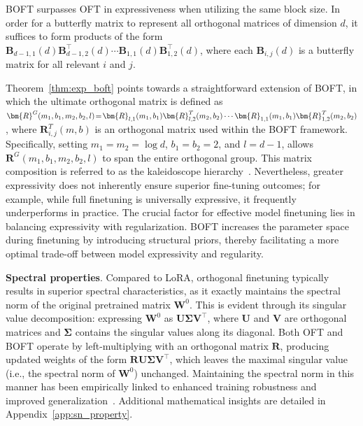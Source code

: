 \begin{theorem}\label{thm:exp_boft}
    BOFT surpasses OFT in expressiveness when utilizing the same block size. In order for a butterfly matrix to represent all orthogonal matrices of dimension $d$, it suffices to form products of the form $\bm{B}_{d-1,1}(d)\bm{B}^\top_{d-1,2}(d)\cdots\bm{B}_{1,1}(d)\bm{B}^\top_{1,2}(d)$, where each $\bm{B}_{i,j}(d)$ is a butterfly matrix for all relevant $i$ and $j$.
\end{theorem}

Theorem~\ref{thm:exp_boft} points towards a straightforward extension of BOFT, in which the ultimate orthogonal matrix is defined as $\thickmuskip=2mu \medmuskip=2mu \bm{R}^G(m_1,b_1,m_2,b_2,l)=\bm{R}_{l,1}(m_1,b_1)\bm{R}_{l,2}^T(m_2,b_2)\cdots\bm{R}_{1,1}(m_1,b_1)\bm{R}_{1,2}^T(m_2,b_2)$, where $\bm{R}_{i,j}^T(m,b)$ is an orthogonal matrix used within the BOFT framework. Specifically, setting $m_1=m_2=\log d$, $b_1=b_2=2$, and $l=d-1$, allows $\bm{R}^G(m_1,b_1,m_2,b_2,l)$ to span the entire orthogonal group. This matrix composition is referred to as the kaleidoscope hierarchy~\cite{dao2019kaleidoscope}. Nevertheless, greater expressivity does not inherently ensure superior fine-tuning outcomes; for example, while full finetuning is universally expressive, it frequently underperforms in practice. The crucial factor for effective model finetuning lies in balancing expressivity with regularization. BOFT increases the parameter space during finetuning by introducing structural priors, thereby facilitating a more optimal trade-off between model expressivity and regularity.

\textbf{Spectral properties}. Compared to LoRA, orthogonal finetuning typically results in superior spectral characteristics, as it exactly maintains the spectral norm of the original pretrained matrix $\bm{W}^0$. This is evident through its singular value decomposition: expressing $\bm{W}^0$ as $\bm{U}\bm{\Sigma}\bm{V}^\top$, where $\bm{U}$ and $\bm{V}$ are orthogonal matrices and $\bm{\Sigma}$ contains the singular values along its diagonal. Both OFT and BOFT operate by left-multiplying with an orthogonal matrix $\bm{R}$, producing updated weights of the form $\bm{R}\bm{U}\bm{\Sigma}\bm{V}^\top$, which leaves the maximal singular value (i.e., the spectral norm of $\bm{W}^0$) unchanged. Maintaining the spectral norm in this manner has been empirically linked to enhanced training robustness and improved generalization~\cite{miyato2018spectral,yoshida2017spectral}. Additional mathematical insights are detailed in Appendix~\ref{app:sn_property}.

